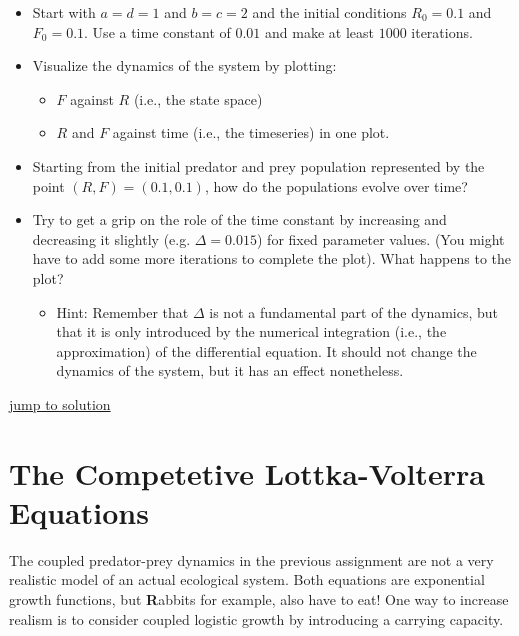 \documentclass[]{book}
\providecommand{\tightlist}{%
  \setlength{\itemsep}{0pt}\setlength{\parskip}{0pt}}
\let\stdsection\section
\renewcommand\section{\newpage\stdsection}
\begin{document}
\begin{itemize}
\tightlist
\item
  Start with \(a = d = 1\) and \(b = c = 2\) and the initial conditions
  \(R_0 = 0.1\) and \(F_0 = 0.1\). Use a time constant of \(0.01\) and
  make at least \(1000\) iterations.
\item
  Visualize the dynamics of the system by plotting:

  \begin{itemize}
  \tightlist
  \item
    \(F\) against \(R\) (i.e., the state space)
  \item
    \(R\) and \(F\) against time (i.e., the timeseries) in one plot.
  \end{itemize}
\item
  Starting from the initial predator and prey population represented by
  the point \((R, F) = (0.1, 0.1)\), how do the populations evolve over
  time?
\item
  Try to get a grip on the role of the time constant by increasing and
  decreasing it slightly (e.g. \(\Delta = 0.015\)) for fixed parameter
  values. (You might have to add some more iterations to complete the
  plot). What happens to the plot?

  \begin{itemize}
  \tightlist
  \item
    Hint: Remember that \(\Delta\) is not a fundamental part of the
    dynamics, but that it is only introduced by the numerical
    integration (i.e., the approximation) of the differential equation.
    It should not change the dynamics of the system, but it has an
    effect nonetheless.
  \end{itemize}
\end{itemize}

\protect\hyperlink{ppdsol}{\textbar{} jump to solution \textbar{}}

\section{The Competetive Lottka-Volterra
Equations}\label{the-competetive-lottka-volterra-equations}

The coupled predator-prey dynamics in the previous assignment are not a
very realistic model of an actual ecological system. Both equations are
exponential growth functions, but \textbf{R}abbits for example, also
have to eat! One way to increase realism is to consider coupled logistic
growth by introducing a carrying capacity.
\end{document}
